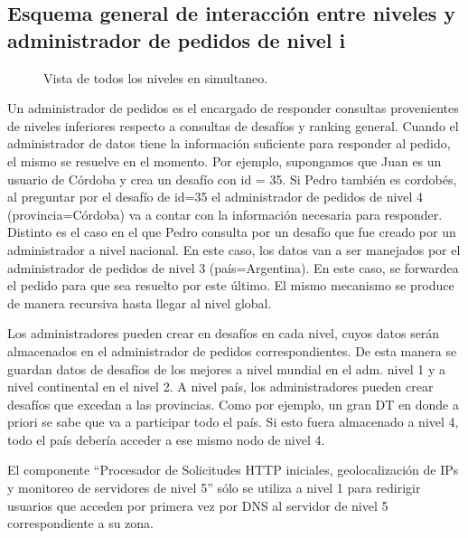 \subsection{Esquema general de interacción entre niveles y administrador de pedidos de nivel i}

\begin{figure}[H]
   \centering
   \caption{Vista de todos los niveles en simultaneo.}
\end{figure}

\begin{figure}[H]
   \centering
\end{figure}

Un administrador de pedidos es el encargado de responder consultas provenientes de niveles inferiores respecto a consultas de desafíos y ranking general. Cuando el administrador de datos tiene la información suficiente para responder al pedido, el
mismo se resuelve en el momento. Por ejemplo, supongamos que Juan es un usuario de Córdoba y crea un desafío con id = 35.
Si Pedro también es cordobés, al preguntar por el desafío de id=35 el administrador de pedidos de nivel 4 (provincia=Córdoba) va a contar con la información necesaria para responder.
Distinto es el caso en el que Pedro consulta por un desafío que fue creado por un administrador a nivel nacional. En este caso, los datos van a ser manejados por el administrador de pedidos de nivel 3 (país=Argentina). En este caso, se forwardea el
pedido para que sea resuelto por este último.
El mismo mecanismo se produce de manera recursiva hasta llegar al nivel global.

Los administradores pueden crear en desafíos en cada nivel, cuyos datos serán almacenados en el administrador de pedidos
correspondientes. De esta manera se guardan datos de desafíos de los mejores a nivel mundial en el adm. nivel 1 y a nivel continental en el nivel 2. A nivel país, los administradores pueden crear desafíos que excedan a las provincias. Como por ejemplo, un gran DT en donde a priori se sabe que va a participar todo el país. Si esto fuera almacenado a nivel 4, todo el país debería acceder a ese mismo nodo de nivel 4.

El componente ``Procesador de Solicitudes HTTP iniciales, geolocalización de IPs y monitoreo de servidores de nivel 5'' sólo se utiliza a nivel 1 para redirigir usuarios que acceden por primera vez por DNS al servidor de nivel 5 correspondiente a su zona.

